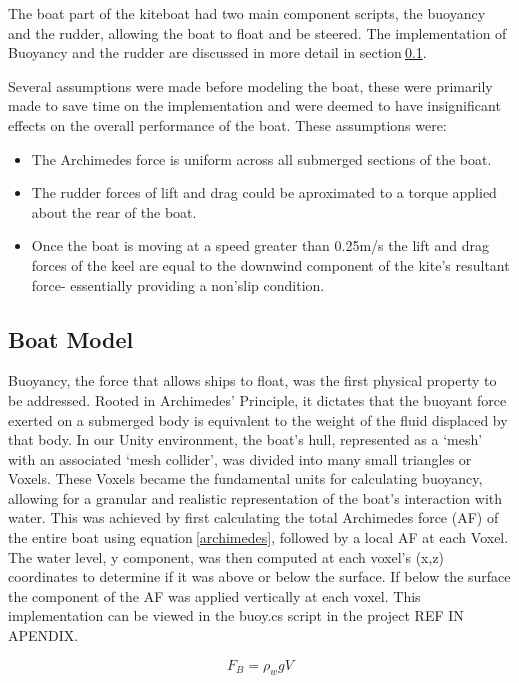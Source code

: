 The boat part of the kiteboat had two main component scripts, the buoyancy and the rudder, allowing the boat to float and be steered. The implementation of Buoyancy and the rudder are discussed in more detail in section$~$\ref{sec:Boat}. 

Several assumptions were made before modeling the boat, these were primarily made to save time on the implementation and were deemed to have insignificant effects on the overall performance of the boat. These assumptions were:
\begin{itemize}
    \item The Archimedes force is uniform across all submerged sections of the boat.
    \item The rudder forces of lift and drag could be aproximated to a torque applied about the rear of the boat.
    \item Once the boat is moving at a speed greater than 0.25m/s the lift and drag forces of the keel are equal to the downwind component of the kite's resultant force- essentially providing a non'slip condition.
\end{itemize}
\subsection{Boat Model}\label{sec:Boat}
Buoyancy, the force that allows ships to float, was the first physical property to be addressed. Rooted in Archimedes' Principle, it dictates that the buoyant force exerted on a submerged body is equivalent to the weight of the fluid displaced by that body. In our Unity environment, the boat's hull, represented as a `mesh' with an associated `mesh collider', was divided into many small triangles or Voxels. These Voxels became the fundamental units for calculating buoyancy, allowing for a granular and realistic representation of the boat's interaction with water. This was achieved by first calculating the total Archimedes force (AF) of the entire boat using equation$~$\ref{archimedes}, followed by a local AF at each Voxel. The water level, y component, was then computed at each voxel's (x,z) coordinates to determine if it was above or below the surface. If below the surface the component of the AF was applied vertically at each voxel. This implementation can be viewed in the buoy.cs script in the project REF IN APENDIX.

\begin{equation}
    F_B = \rho_{w}gV
    \label{archimedes}
\end{equation}

